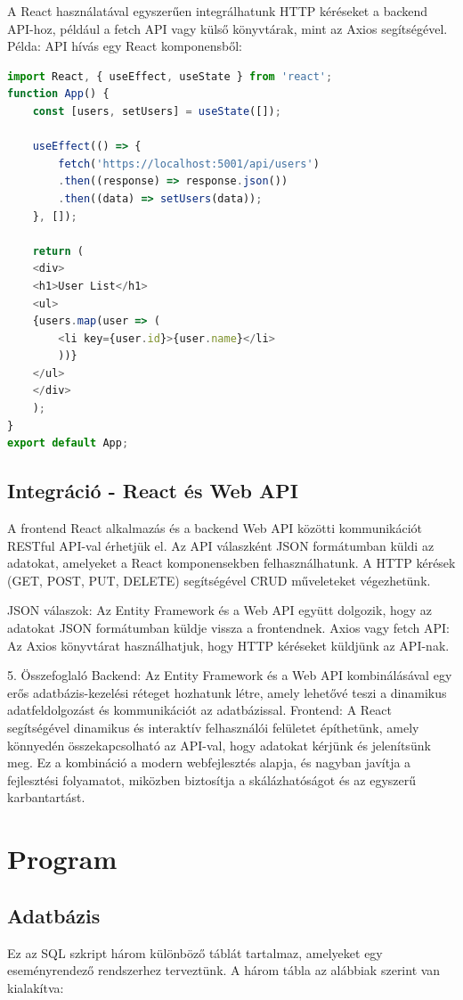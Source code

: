 \documentclass[colorlinks]{thesis-kando}
\theoremstyle{definition}
\theoremstyle{remark}
\begin{document}
A React használatával egyszerűen integrálhatunk HTTP kéréseket a backend API-hoz, például a fetch API vagy külső könyvtárak, mint az Axios segítségével.
Példa: API hívás egy React komponensből:
\begin{lstlisting}[language=JavaScript]
import React, { useEffect, useState } from 'react';
function App() {
	const [users, setUsers] = useState([]);
	
	useEffect(() => {
		fetch('https://localhost:5001/api/users')
		.then((response) => response.json())
		.then((data) => setUsers(data));
	}, []);
	
	return (
	<div>
	<h1>User List</h1>
	<ul>
	{users.map(user => (
		<li key={user.id}>{user.name}</li>
		))}
	</ul>
	</div>
	);
}
export default App;
\end{lstlisting}
\section {Integráció - React és Web API}
A frontend React alkalmazás és a backend Web API közötti kommunikációt RESTful API-val érhetjük el. Az API válaszként JSON formátumban küldi az adatokat, amelyeket a React komponensekben felhasználhatunk. A HTTP kérések (GET, POST, PUT, DELETE) segítségével CRUD műveleteket végezhetünk.

JSON válaszok: Az Entity Framework és a Web API együtt dolgozik, hogy az adatokat JSON formátumban küldje vissza a frontendnek.
Axios vagy fetch API: Az Axios könyvtárat használhatjuk, hogy HTTP kéréseket küldjünk az API-nak.
\par
5. Összefoglaló
Backend: Az Entity Framework és a Web API kombinálásával egy erős adatbázis-kezelési réteget hozhatunk létre, amely lehetővé teszi a dinamikus adatfeldolgozást és kommunikációt az adatbázissal.
Frontend: A React segítségével dinamikus és interaktív felhasználói felületet építhetünk, amely könnyedén összekapcsolható az API-val, hogy adatokat kérjünk és jelenítsünk meg.
Ez a kombináció a modern webfejlesztés alapja, és nagyban javítja a fejlesztési folyamatot, miközben biztosítja a skálázhatóságot és az egyszerű karbantartást.
\chapter{Program}

\section{Adatbázis}
Ez az SQL szkript három különböző táblát tartalmaz, amelyeket egy eseményrendező rendszerhez terveztünk. A három tábla az alábbiak szerint van kialakítva:
\end{document}
